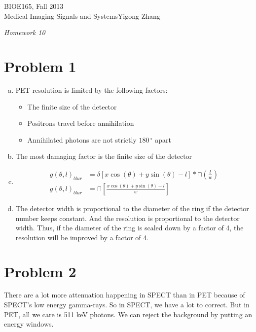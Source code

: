 \documentclass[12pt]{article}
\begin{document}
{\parindent 0pt
BIOE165, Fall 2013\\
 Medical Imaging Signals and Systems\hfill Yigong Zhang \vskip 0.8in}

\begin{center}
{\Large\em Homework 10 }\\[0.7in]
\end{center}


\section*{Problem 1}

\begin{enumerate}[a)]
\item PET resolution is limited by the following factors:
	\begin{itemize}
	\item The finite size of the detector
	\item Positrons travel before annihilation
	\item Annihilated photons are not strictly $180\,^{\circ}$ apart
	\end{itemize}
\item The most damaging factor is the finite size of the detector
\item 
\begin{align*}
g(\theta, l)_{blur} &= \delta [x \cos(\theta)+y \sin(\theta)- l] \ast \sqcap(\frac{l}{w})
\\g(\theta, l)_{blur} &=\sqcap[\frac{x \cos(\theta)+y \sin(\theta)- l}{w}]
\end{align*}

\item The detector width is proportional to the diameter of the ring if the detector number keeps constant. And the resolution is proportional to the detector width. Thus, if the diameter of the ring is scaled down by a factor of 4, the resolution will be improved by a factor of 4.
				
\end{enumerate}

\section*{Problem 2}
There are a lot more attenuation happening in SPECT than in PET because of SPECT's low energy gamma-rays. So in SPECT, we have a lot to correct. But in PET, all we care is 511 keV photons. We can reject the background by putting an energy windows.
\end{document}
